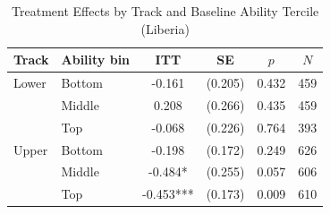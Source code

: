 \begin{table}[htbp]
\centering\small
\caption{Treatment Effects by Track and Baseline Ability Tercile (Liberia)}
\label{tab:track_bins}
\begin{tabular}{llcccc}
\toprule
Track & Ability bin & ITT & SE & $p$ & $N$ \\
\midrule
Lower & Bottom & -0.161 & (0.205) & 0.432 & 459 \\
 & Middle & 0.208 & (0.266) & 0.435 & 459 \\
 & Top & -0.068 & (0.226) & 0.764 & 393 \\
Upper & Bottom & -0.198 & (0.172) & 0.249 & 626 \\
 & Middle & -0.484* & (0.255) & 0.057 & 606 \\
 & Top & -0.453*** & (0.173) & 0.009 & 610 \\
\bottomrule
\end{tabular}
\par\smallskip{}
\end{table}
